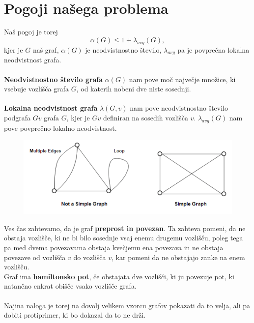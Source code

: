 \documentclass[12pt,a4paper]{amsart}
\theoremstyle{definition} %
\theoremstyle{plain} %
\begin{document}
\section{Pogoji našega problema}
Naš pogoj je torej $$ \alpha(G) \leq 1 + \lambda_{avg}(G),$$
kjer je $G$ naš graf, $\alpha(G)$ je neodvistnostno število, $\lambda_{avg}$ pa je povprečna lokalna neodvistnost grafa.\\
\ \\
\textbf{Neodvistnostno število grafa} $\alpha(G)$ nam pove moč največje množice, ki vsebuje  vozlišča grafa $G$, od katerih nobeni dve niste sosednji.\\
\ \\
\textbf{Lokalna neodvistnost grafa} $\lambda(G, v)$ nam pove neodvistnostno število podgrafa $Gv$ grafa $G$, kjer je $Gv$ definiran na sosedih vozlišča $v$. $\lambda_{avg}(G)$ nam pove povprečno lokalno neodvistnost.\\
\begin{figure}[h]
	\centering

	\includegraphics[scale=1]{slike/graf1}
\end{figure}

Ves čas zahtevamo, da je graf \textbf{preprost in povezan}. Ta zahteva pomeni, da ne obstaja vozlišče, ki ne bi bilo sosednje vsaj enemu drugemu vozlišču, poleg tega pa med dvema povezavama obstaja kvečjemu ena povezava in ne obstaja  povezave od vozlišča $v$ do vozlišča $v$, kar pomeni da ne obstajajo zanke na enem vozlišču.\\
 
Graf ima \textbf{hamiltonsko pot}, če obstajata dve vozlišči, ki ju povezuje pot, ki natančno enkrat obišče vsako vozlišče grafa.\\
\ \\
Najina naloga je torej na dovolj velikem vzorcu grafov pokazati da to velja, ali pa dobiti protiprimer, ki bo dokazal da to ne drži.\\
\end{document}
